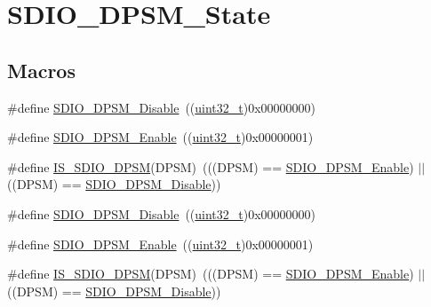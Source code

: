 \hypertarget{group___s_d_i_o___d_p_s_m___state}{}\section{S\+D\+I\+O\+\_\+\+D\+P\+S\+M\+\_\+\+State}
\label{group___s_d_i_o___d_p_s_m___state}
\subsection*{Macros}
\begin{DoxyCompactItemize}
\item 
\#define \hyperlink{group___s_d_i_o___d_p_s_m___state_ga156a9f6ab87a46dcb99ddd7462ca064b}{S\+D\+I\+O\+\_\+\+D\+P\+S\+M\+\_\+\+Disable}~((\hyperlink{_p_e___types_8h_a33594304e786b158f3fb30289278f5af}{uint32\+\_\+t})0x00000000)
\item 
\#define \hyperlink{group___s_d_i_o___d_p_s_m___state_ga22bc12465c1cf839145619a859276c37}{S\+D\+I\+O\+\_\+\+D\+P\+S\+M\+\_\+\+Enable}~((\hyperlink{_p_e___types_8h_a33594304e786b158f3fb30289278f5af}{uint32\+\_\+t})0x00000001)
\item 
\#define \hyperlink{group___s_d_i_o___d_p_s_m___state_gac87a2d7a8fc417a4514d733be50e6d63}{I\+S\+\_\+\+S\+D\+I\+O\+\_\+\+D\+P\+SM}(D\+P\+SM)~(((D\+P\+SM) == \hyperlink{openmotestm_2library_2inc_2stm32f10x__sdio_8h_a22bc12465c1cf839145619a859276c37}{S\+D\+I\+O\+\_\+\+D\+P\+S\+M\+\_\+\+Enable}) $\vert$$\vert$ ((D\+P\+SM) == \hyperlink{openmotestm_2library_2inc_2stm32f10x__sdio_8h_a156a9f6ab87a46dcb99ddd7462ca064b}{S\+D\+I\+O\+\_\+\+D\+P\+S\+M\+\_\+\+Disable}))
\item 
\#define \hyperlink{group___s_d_i_o___d_p_s_m___state_ga156a9f6ab87a46dcb99ddd7462ca064b}{S\+D\+I\+O\+\_\+\+D\+P\+S\+M\+\_\+\+Disable}~((\hyperlink{_p_e___types_8h_a33594304e786b158f3fb30289278f5af}{uint32\+\_\+t})0x00000000)
\item 
\#define \hyperlink{group___s_d_i_o___d_p_s_m___state_ga22bc12465c1cf839145619a859276c37}{S\+D\+I\+O\+\_\+\+D\+P\+S\+M\+\_\+\+Enable}~((\hyperlink{_p_e___types_8h_a33594304e786b158f3fb30289278f5af}{uint32\+\_\+t})0x00000001)
\item 
\#define \hyperlink{group___s_d_i_o___d_p_s_m___state_gac87a2d7a8fc417a4514d733be50e6d63}{I\+S\+\_\+\+S\+D\+I\+O\+\_\+\+D\+P\+SM}(D\+P\+SM)~(((D\+P\+SM) == \hyperlink{openmotestm_2library_2inc_2stm32f10x__sdio_8h_a22bc12465c1cf839145619a859276c37}{S\+D\+I\+O\+\_\+\+D\+P\+S\+M\+\_\+\+Enable}) $\vert$$\vert$ ((D\+P\+SM) == \hyperlink{openmotestm_2library_2inc_2stm32f10x__sdio_8h_a156a9f6ab87a46dcb99ddd7462ca064b}{S\+D\+I\+O\+\_\+\+D\+P\+S\+M\+\_\+\+Disable}))
\end{DoxyCompactItemize}


